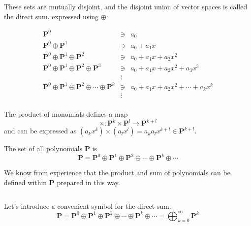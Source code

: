 \documentclass[uplatex,a4j,12pt,dvipdfmx]{jsarticle}
\begin{document}
These sets are mutually disjoint, and the disjoint union of vector spaces is called the direct sum, expressed using $\oplus$:

\[
	\begin{array}{rcl}
		\mathbf{P}^{0}                                                                                 & \ni    & a_{0}                                                \\
		\mathbf{P}^{0} \oplus \mathbf{P}^{1}                                                           & \ni    & a_{0} + a_{1} x                                      \\
		\mathbf{P}^{0} \oplus \mathbf{P}^{1} \oplus \mathbf{P}^{2}                                     & \ni    & a_{0} + a_{1} x + a_{2} x^{2}                        \\
		\mathbf{P}^{0} \oplus \mathbf{P}^{1} \oplus \mathbf{P}^{2} \oplus \mathbf{P}^{3}               & \ni    & a_{0} + a_{1} x + a_{2} x^{2} + a_{3} x^{3}          \\
		                                                                                               & \vdots &                                                      \\
		\mathbf{P}^{0} \oplus \mathbf{P}^{1} \oplus \mathbf{P}^{2} \oplus \cdots \oplus \mathbf{P}^{k} & \ni    & a_{0} + a_{1} x + a_{2} x^{2} + \cdots + a_{k} x^{k} \\
		                                                                                               & \vdots &                                                      \\
	\end{array}
\]

The product of monomials defines a map
$$
	\times : \mathbf{P}^{k} \times \mathbf{P}^{l} \to \mathbf{P}^{k+l}
$$
and can be expressed as $ (a_{k} x^{k}) \times (a_{l} x^{l}) = a_{k} a_{l} x^{k+l} \in \mathbf{P}^{k+l}$.

The set of all polynomials $\mathbf{P}$ is
$$
	\mathbf{P}
	=
	\mathbf{P}^{0} \oplus \mathbf{P}^{1} \oplus \mathbf{P}^{2} \oplus \cdots \oplus \mathbf{P}^{k} \oplus \cdots
$$

We know from experience that the product and sum of polynomials can be defined within $\mathbf{P}$ prepared in this way.

${}$

Let's introduce a convenient symbol for the direct sum.
$$
	\mathbf{P}
	=
	\mathbf{P}^{0} \oplus \mathbf{P}^{1} \oplus \mathbf{P}^{2} \oplus \cdots \oplus \mathbf{P}^{k} \oplus \cdots
	=
	\displaystyle \bigoplus_{k=0}^{\infty} \mathbf{P}^{k}
$$
\end{document}
